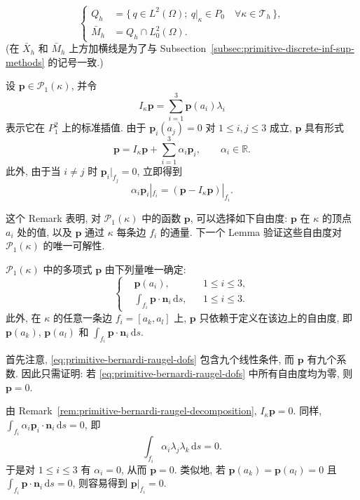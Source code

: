 \begin{equation}\label{eq:primitive-bernardi-raugel-pressure-spaces}
\left\{
\begin{aligned}
Q_h&=\{\,q\in L^2(\Omega);
\ q|_\kappa\in P_0\quad\forall\kappa\in\mathcal{T}_h\,\},\\
\bar M_h&=Q_h\cap L_0^2(\Omega).
\end{aligned}
\right.
\end{equation}
(在 $\bar X_h$ 和 $\bar M_h$ 上方加横线是为了与
Subsection~\ref{subsec:primitive-discrete-inf-sup-methods} 的记号一致.)

\setcounter{statement}{0}
\begin{Remark}\label{rem:primitive-bernardi-raugel-decomposition}
设 $\mathbf p\in\mathcal{P}_1(\kappa)$, 并令
\[
I_\kappa\mathbf p=\sum_{i=1}^3\mathbf p(a_i)\lambda_i
\]
表示它在 $P_1^2$ 上的标准插值. 由于
$\mathbf p_i(a_j)=0$ 对 $1\leq i,j\leq3$ 成立, $\mathbf p$ 具有形式
\[
\mathbf p=I_\kappa\mathbf p+\sum_{i=1}^3\alpha_i\mathbf p_i,
\qquad \alpha_i\in\mathbb{R}.
\]
此外, 由于当 $i\ne j$ 时 $\mathbf p_i|_{f_j}=0$, 立即得到
\[
\alpha_i\mathbf p_i|_{f_i}
=(\mathbf p-I_\kappa\mathbf p)|_{f_i}.
\]
\end{Remark}

这个 Remark 表明, 对 $\mathcal{P}_1(\kappa)$ 中的函数 $\mathbf p$,
可以选择如下自由度: $\mathbf p$ 在 $\kappa$ 的顶点 $a_i$ 处的值,
以及 $\mathbf p$ 通过 $\kappa$ 每条边 $f_i$ 的通量. 下一个 Lemma
验证这些自由度对 $\mathcal{P}_1(\kappa)$ 的唯一可解性.

\setcounter{statement}{0}
\begin{Lemma}\label{lem:primitive-bernardi-raugel-unisolvence}
$\mathcal{P}_1(\kappa)$ 中的多项式 $\mathbf p$ 由下列量唯一确定:
\begin{equation}\label{eq:primitive-bernardi-raugel-dofs}
\left\{
\begin{aligned}
&\mathbf p(a_i),&&1\leq i\leq3,\\
&\int_{f_i}\mathbf p\cdot\mathbf n_i\,\mathrm ds,
&&1\leq i\leq3.
\end{aligned}
\right.
\end{equation}
此外, 在 $\kappa$ 的任意一条边 $f_i=[a_k,a_l]$ 上,
$\mathbf p$ 只依赖于定义在该边上的自由度, 即
$\mathbf p(a_k)$, $\mathbf p(a_l)$ 和
$\int_{f_i}\mathbf p\cdot\mathbf n_i\,\mathrm ds$.
\end{Lemma}

\begin{Proof}
首先注意, 
\eqref{eq:primitive-bernardi-raugel-dofs} 包含九个线性条件,
而 $\mathbf p$ 有九个系数. 因此只需证明: 若
\eqref{eq:primitive-bernardi-raugel-dofs} 中所有自由度均为零,
则 $\mathbf p=0$.

由 Remark~\ref{rem:primitive-bernardi-raugel-decomposition},
$I_\kappa\mathbf p=0$. 同样,
$\int_{f_i}\alpha_i\mathbf p_i\cdot\mathbf n_i\,\mathrm ds=0$, 即
\[
\int_{f_i}\alpha_i\lambda_j\lambda_k\,\mathrm ds=0.
\]
于是对 $1\leq i\leq3$ 有 $\alpha_i=0$, 从而 $\mathbf p=0$.
类似地, 若 $\mathbf p(a_k)=\mathbf p(a_l)=0$ 且
$\int_{f_i}\mathbf p\cdot\mathbf n_i\,\mathrm ds=0$,
则容易得到 $\mathbf p|_{f_i}=0$.
\end{Proof}


